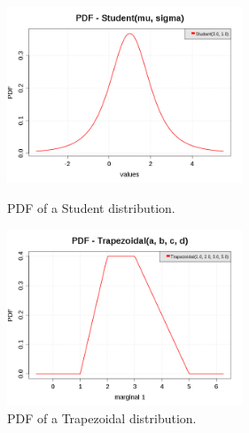 \begin{figure}[H]
  \begin{minipage}{10cm}
    \begin{center}
      \includegraphics[width=7cm]{pdf_Student.png}
      \caption{PDF of a Student distribution.}
      \label{PDFStudent}
    \end{center}
  \end{minipage}
  \hfill
  \begin{minipage}{10cm}
    \begin{center}
      \includegraphics[width=7cm]{pdf_Trapezoidal.png}
      \caption{PDF of a Trapezoidal distribution.}
      \label{PDFTrapezoidal}
    \end{center}
  \end{minipage}
\end{figure}

